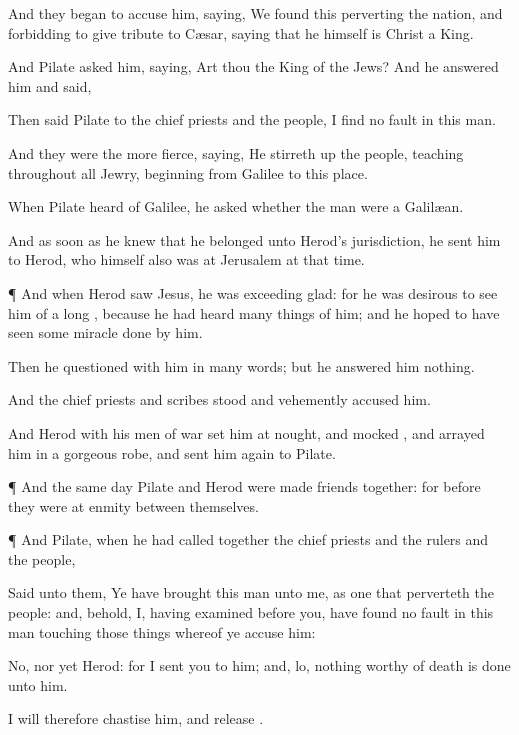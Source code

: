 {And they
began to
accuse
him,
saying, We
found
this
{}
perverting the
nation,
and
forbidding to
give
tribute to
Cæsar,
saying that he
himself
is
Christ a
King.

And
Pilate
asked
him,
saying,
Art
thou the
King of the
Jews?
And he
answered
him and
said,
{}

Then
said
Pilate
to the chief
priests
and
{} the
people, I
find
no
fault
in
this
man.

And they were the more
fierce,
saying, He stirreth
up the
people,
teaching
throughout
all
Jewry,
beginning
from
Galilee
to this
place.

When
Pilate
heard of
Galilee, he
asked
whether the
man
were a
Galilæan.

And as soon as he
knew
that he
belonged
unto
Herod’s
jurisdiction, he
sent
him
to
Herod, who
himself
also
was
at
Jerusalem
at
that
time.


\par }{\PP {}¶ And
when
Herod
saw
Jesus, he
was
exceeding
glad:
for he
was
desirous to
see
him
of a
long
{},
because he had
heard many
things
of
him;
and he
hoped to have
seen
some
miracle
done
by
him.

Then
he
questioned with
him
in
many
words;
but he
answered
him
nothing.

And the chief
priests
and
scribes
stood
and
vehemently
accused
him.

And
Herod
with
his men of
war
set
him at
nought,
and
mocked
{}, and
arrayed
him in a
gorgeous
robe, and
sent
him
again to
Pilate.


\par }{\PP {}¶
And the
same
day
Pilate
and
Herod were
made
friends
together:
for
before they
were
at
enmity
between
themselves.


\par }{\PP {}¶
And
Pilate, when he had called
together the chief
priests
and the
rulers
and the
people,

Said
unto
them, Ye have
brought
this
man unto
me,
as one that
perverteth the
people:
and,
behold,
I, having
examined
{}
before
you, have
found
no
fault
in
this
man touching those things
whereof ye
accuse
him:

No, nor
yet
Herod:
for I
sent
you
to
him;
and,
lo,
nothing
worthy of
death
is
done unto
him.

I
will
therefore
chastise
him, and
release
{}.

}
